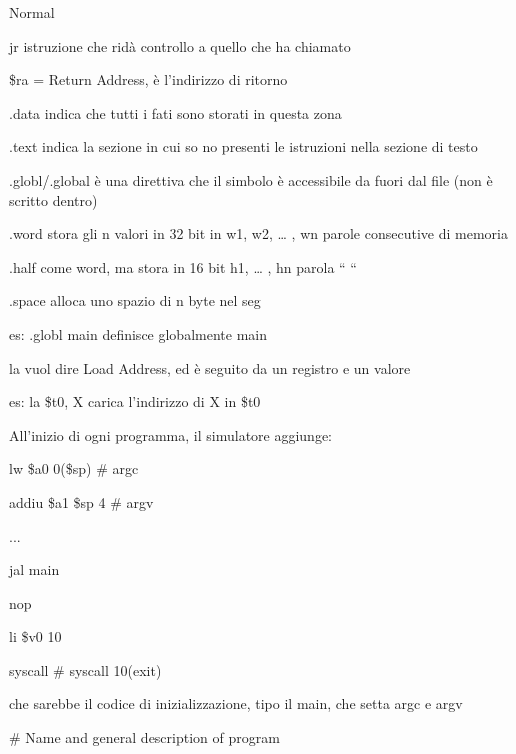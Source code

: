 \documentclass{article} %
\begin{document}


\noindent Normal

\noindent 

\noindent 

\noindent 

\noindent jr istruzione che rid\`{a} controllo a quello che ha chiamato

\noindent \$ra = Return Address, \`{e} l'indirizzo di ritorno 

\noindent .data indica che tutti i fati sono storati in questa zona

\noindent .text indica la sezione in cui so  no presenti le istruzioni nella sezione di testo

\noindent .globl/.global \`{e} una direttiva che il simbolo \`{e} accessibile da fuori dal file (non \`{e} scritto dentro)

\noindent .word stora gli n valori in 32 bit in w1, w2, {\dots} , wn parole consecutive di memoria

\noindent .half come word, ma stora in 16 bit h1, {\dots} , hn parola `` ``

\noindent .space alloca uno spazio di n byte nel seg

 es: .globl main  definisce globalmente main

\noindent la vuol dire Load Address, ed \`{e} seguito da un registro e un valore 

 es: la \$t0, X carica l'indirizzo di X in \$t0

\noindent 

\noindent 

\noindent All'inizio di ogni programma, il simulatore aggiunge:

\noindent     lw    \$a0 0(\$sp)   \# argc 

\noindent     addiu \$a1 \$sp 4    \# argv 

\noindent     ...

\noindent     jal   main 

\noindent     nop 

\noindent     li    \$v0 10 

\noindent     syscall            \# syscall 10(exit) 

\noindent 

\noindent che sarebbe il codice di inizializzazione, tipo il main, che setta argc e argv

\noindent \# Name and general description of program 
\end{document}
